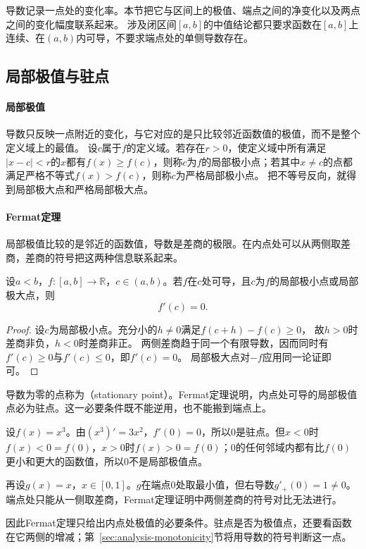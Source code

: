 导数记录一点处的变化率。本节把它与区间上的极值、端点之间的净变化以及两点之间的变化幅度联系起来。
涉及闭区间$[a,b]$的中值结论都只要求函数在$[a,b]$上连续、在$(a,b)$内可导，不要求端点处的单侧导数存在。

\subsection{局部极值与驻点}

\paragraph{局部极值}
导数只反映一点附近的变化，与它对应的是只比较邻近函数值的极值，而不是整个定义域上的最值。
设$c$属于$f$的定义域。若存在$r>0$，使定义域中所有满足$|x-c|<r$的$x$都有$f(x)\geq f(c)$，则称$c$为$f$的局部极小点；若其中$x\neq c$的点都满足严格不等式$f(x)>f(c)$，则称$c$为严格局部极小点。
把不等号反向，就得到局部极大点和严格局部极大点。

\paragraph{Fermat定理}
局部极值比较的是邻近的函数值，导数是差商的极限。在内点处可以从两侧取差商，差商的符号把这两种信息联系起来。
\begin{theorem}[Fermat定理]
\label{thm:analysis-fermat}
设$a<b$，$f:[a,b]\to\mathbb R$，$c\in(a,b)$。若$f$在$c$处可导，且$c$为$f$的局部极小点或局部极大点，则
\begin{equation}
 f'(c)=0.
\label{eq:analysis-scalar-first-order-necessary}
\end{equation}
\end{theorem}
\begin{proof}
设$c$为局部极小点。充分小的$h\neq0$满足$f(c+h)-f(c)\geq0$，
故$h>0$时差商非负，$h<0$时差商非正。
两侧差商趋于同一个有限导数，因而同时有$f'(c)\geq0$与$f'(c)\leq0$，即$f'(c)=0$。
局部极大点对$-f$应用同一论证即可。
\end{proof}
导数为零的点称为（stationary point）。Fermat定理说明，内点处可导的局部极值点必为驻点。这一必要条件既不能逆用，也不能搬到端点上。
\begin{example}[非极值的驻点与端点处的极值]
\label{ex:analysis-fermat-condition-failures}
设$f(x)=x^3$。由$(x^3)'=3x^2$，$f'(0)=0$，所以$0$是驻点。但$x<0$时$f(x)<0=f(0)$，$x>0$时$f(x)>0=f(0)$；$0$的任何邻域内都有比$f(0)$更小和更大的函数值，所以$0$不是局部极值点。

再设$g(x)=x$，$x\in[0,1]$。$g$在端点$0$处取最小值，但右导数$g'_+(0)=1\neq0$。端点处只能从一侧取差商，Fermat定理证明中两侧差商的符号对比无法进行。
\end{example}
因此Fermat定理只给出内点处极值的必要条件。驻点是否为极值点，还要看函数在它两侧的增减；第~\ref{sec:analysis-monotonicity}节将用导数的符号判断这一点。

